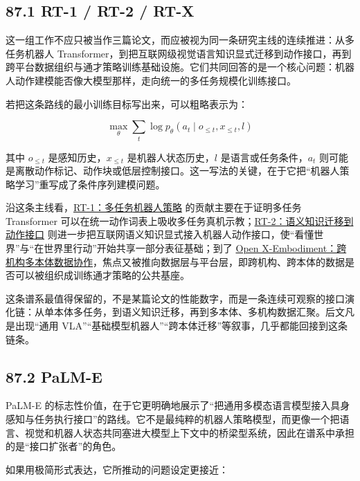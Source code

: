\subsection*{87.1 RT-1 / RT-2 / RT-X}


这一组工作不应只被当作三篇论文，而应被视为同一条研究主线的连续推进：从多任务机器人 Transformer，到把互联网级视觉语言知识显式迁移到动作接口，再到跨平台数据组织与通才策略训练基础设施。它们共同回答的是一个核心问题：机器人动作建模能否像大模型那样，走向统一的多任务规模化训练接口。

若把这条路线的最小训练目标写出来，可以粗略表示为：

\begingroup
\footnotesize
\begin{equation*}
\max_{\theta} \sum_t \log p_{\theta}(a_t \mid o_{\le t}, x_{\le t}, l)
\end{equation*}
\endgroup

其中 \(o_{\le t}\) 是感知历史，\(x_{\le t}\) 是机器人状态历史，\(l\) 是语言或任务条件，\(a_t\) 则可能是离散动作标记、动作块或低层控制接口。这一写法的关键，在于它把“机器人策略学习”重写成了条件序列建模问题。

沿这条主线看，\href{https://arxiv.org/abs/2212.06817}{RT-1：多任务机器人策略} 的贡献主要在于证明多任务 Transformer 可以在统一动作词表上吸收多任务真机示教；\href{https://arxiv.org/abs/2307.15818}{RT-2：语义知识迁移到动作接口} 则进一步把互联网语义知识显式接入机器人动作接口，使“看懂世界”与“在世界里行动”开始共享一部分表征基础；到了 \href{https://arxiv.org/abs/2310.08864}{Open X-Embodiment：跨机构多本体数据协作}，焦点又被推向数据层与平台层，即跨机构、跨本体的数据是否可以被组织成训练通才策略的公共基座。

这条谱系最值得保留的，不是某篇论文的性能数字，而是一条连续可观察的接口演化链：从单本体多任务，到语义知识迁移，再到多本体、多机构数据汇聚。后文凡是出现“通用 VLA”“基础模型机器人”“跨本体迁移”等叙事，几乎都能回接到这条链条。

\subsection*{87.2 PaLM-E}


PaLM-E 的标志性价值，在于它更明确地展示了“把通用多模态语言模型接入具身感知与任务执行接口”的路线。它不是最纯粹的机器人策略模型，而更像一个把语言、视觉和机器人状态共同塞进大模型上下文中的桥梁型系统，因此在谱系中承担的是“接口扩张者”的角色。

如果用极简形式表达，它所推动的问题设定更接近：

